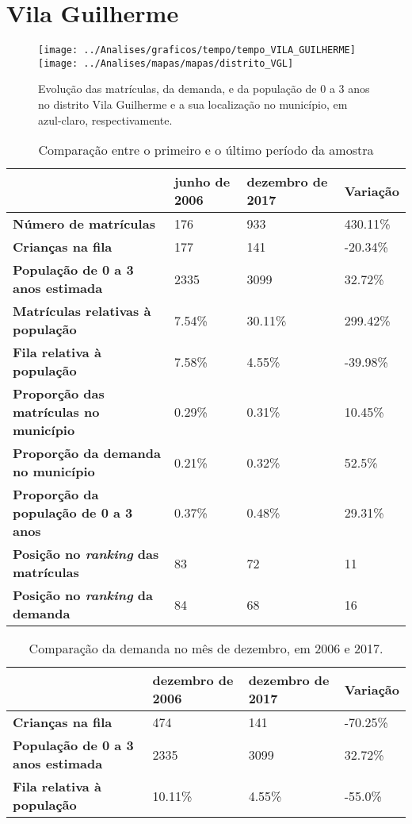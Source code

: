 \section{Vila Guilherme}
\begin{figure}[H]
\centering
\texttt{[image: ../Analises/graficos/tempo/tempo\_VILA\_GUILHERME]}
\texttt{[image: ../Analises/mapas/mapas/distrito\_VGL]}
\caption{Evolução das matrículas, da demanda, e da população de 0 a 3 anos no distrito Vila Guilherme e a sua localização no município, em azul-claro, respectivamente.}
\end{figure}
\begin{table}[H]
\begin{tabular}{l|l|l|l}
\textbf{}                                      & \textbf{junho de 2006}       & \textbf{dezembro de 2017}    & \textbf{Variação} \\ \hline
\textbf{Número de matrículas}                  & 176 & 933 & 430.11\% \\ \hline
\textbf{Crianças na fila}                      & 177 & 141 & -20.34\% \\ \hline
\textbf{População de 0 a 3 anos estimada}      & 2335 & 3099 & 32.72\% \\ \hline
\textbf{Matrículas relativas à população}      & 7.54\% & 30.11\% & 299.42\% \\ \hline
\textbf{Fila relativa à população}             & 7.58\% & 4.55\% & -39.98\% \\ \hline
\textbf{Proporção das matrículas no município} & 0.29\% & 0.31\% & 10.45\% \\ \hline
\textbf{Proporção da demanda no município}     & 0.21\% & 0.32\% & 52.5\% \\ \hline
\textbf{Proporção da população de 0 a 3 anos}  & 0.37\% & 0.48\% & 29.31\% \\ \hline
\textbf{Posição no \textit{ranking} das matrículas}     & 83 & 72 & 11 \\ \hline
\textbf{Posição no \textit{ranking} da demanda}         & 84 & 68 & 16 \\ 
\end{tabular}
\caption{Comparação entre o primeiro e o último período da amostra}
\end{table}
\begin{table}[H]
\begin{tabular}{l|l|l|l}
\textbf{}                                 & \textbf{dezembro de 2006} & \textbf{dezembro de 2017} & \textbf{Variação} \\ \hline
\textbf{Crianças na fila}                      & 474 & 141 & -70.25\% \\ \hline
\textbf{População de 0 a 3 anos estimada}      & 2335 & 3099 & 32.72\% \\ \hline
\textbf{Fila relativa à população}             & 10.11\% & 4.55\% & -55.0\% \\
\end{tabular}
\caption{Comparação da demanda no mês de dezembro, em 2006 e 2017.}
\end{table}
